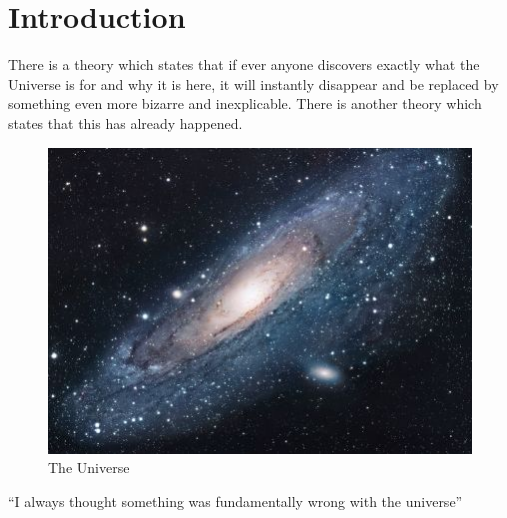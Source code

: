\chapter{Introduction}
There is a theory which states that if ever anyone discovers exactly what the Universe is for and why it is here, it will instantly disappear and be replaced by something even more bizarre and inexplicable.
There is another theory which states that this has already happened.
\begin{figure}[h!]
\centering
\includegraphics[scale=1.7]{res/universe.jpg}
\caption{The Universe}
\label{fig:universe}
\end{figure}

``I always thought something was fundamentally wrong with the universe'' \citep{adams1995hitchhiker}

\pagebreak
